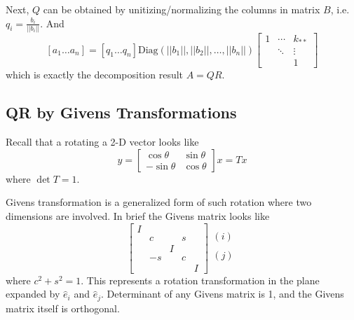 Next, $Q$ can be obtained by unitizing/normalizing the columns in
matrix $B$, i.e. $q_i = \frac{b_i}{||b_i||}$. And
$$
[a_1 \ldots a_n] = [q_1 \ldots q_n] \text{Diag}(||b_1||, ||b_2||, \ldots,
  ||b_n||)
  \begin{bmatrix}
	  1 & \cdots & k_{\ast\ast}\\
	    & \ddots & \vdots \\
		& & 1
  \end{bmatrix}
$$
which is exactly the decomposition result $A=QR$.

\subsection{QR by Givens Transformations}

Recall that a rotating a 2-D vector looks like
$$
y = 
\begin{bmatrix}
	\cos \theta & \sin \theta \\
	-\sin \theta & \cos \theta
\end{bmatrix}
x
= Tx
$$
where $\det T = 1$.

Givens transformation is a generalized form of such rotation where
two dimensions are involved. In brief the Givens matrix looks like
$$
\begin{bmatrix}
	I& & & & \\
	 &c& &s& \\
	 & &I& & \\
	 &-s& &c& \\
	 & & & &I
\end{bmatrix}
\begin{matrix}
	\\
	(i)\\
	\\
	(j)\\
	\\
\end{matrix}
$$
where $c^2 + s^2 = 1$. This represents a rotation transformation in
the plane expanded by $\hat{e}_i$ and $\hat{e}_j$. Determinant of any 
Givens matrix is 1, and the Givens matrix itself is orthogonal.

